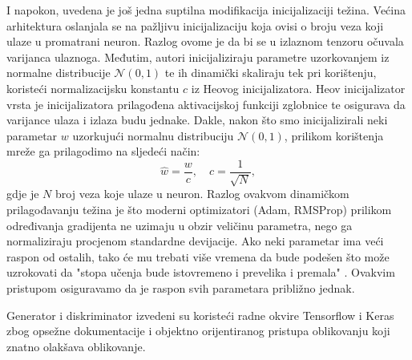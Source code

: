 I napokon, uvedena je još jedna suptilna modifikacija inicijalizaciji težina. Većina arhitektura oslanjala se na pažljivu inicijalizaciju koja ovisi o broju veza koji ulaze u promatrani neuron. Razlog ovome je da bi se u izlaznom tenzoru očuvala varijanca ulaznoga. Međutim, autori inicijaliziraju parametre uzorkovanjem iz normalne distribucije $\mathcal{N}(0, 1)$ te ih dinamički skaliraju tek pri korištenju, koristeći normalizacijsku konstantu $c$ iz Heovog inicijalizatora.  Heov inicijalizator vrsta je inicijalizatora prilagođena aktivacijskoj funkciji zglobnice te osigurava da varijance ulaza i izlaza budu jednake. Dakle, nakon što smo inicijalizirali neki parametar $w$ uzorkujući normalnu distribuciju $\mathcal{N}(0, 1)$, prilikom korištenja mreže ga prilagodimo na sljedeći način:
\begin{equation*}
	\hat{w} = \frac{w}{c}, \quad c = \frac{1}{\sqrt{N}},
\end{equation*}
gdje je $N$ broj veza koje ulaze u neuron. Razlog ovakvom dinamičkom prilagođavanju težina je što moderni optimizatori (Adam, RMSProp) prilikom određivanja gradijenta ne uzimaju u obzir veličinu parametra, nego ga normaliziraju procjenom standardne devijacije. Ako neki parametar ima veći raspon od ostalih, tako će mu trebati više vremena da bude podešen što može uzrokovati da "stopa učenja bude istovremeno i prevelika i premala" . Ovakvim pristupom osiguravamo da je raspon svih parametara približno jednak.

Generator i diskriminator izvedeni su koristeći radne okvire Tensorflow  i Keras  zbog opsežne dokumentacije i objektno orijentiranog pristupa oblikovanju koji znatno olakšava oblikovanje.
